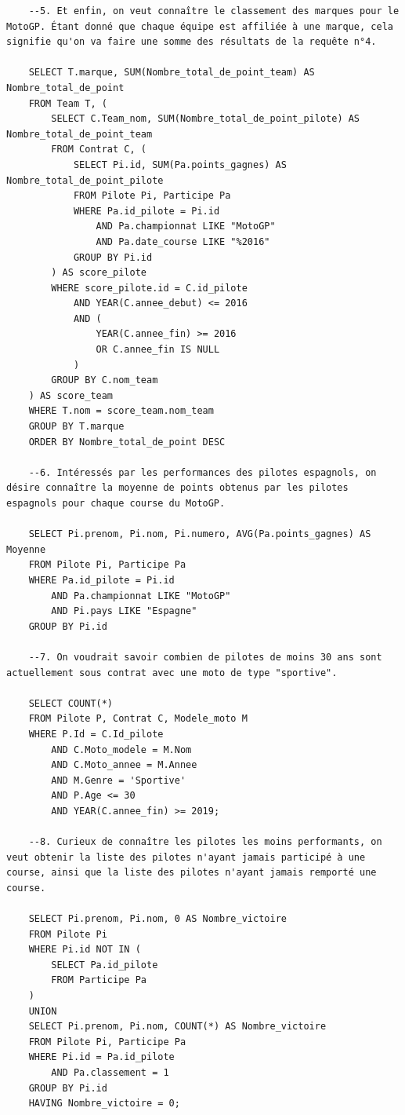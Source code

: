 \documentclass[12pt,a4paper]{article}
\newenvironment{code}{\captionsetup{type=listing}}{}
\begin{document}
\begin{code}
\begin{verbatim}
    --5. Et enfin, on veut connaître le classement des marques pour le MotoGP. Étant donné que chaque équipe est affiliée à une marque, cela signifie qu'on va faire une somme des résultats de la requête n°4.

    SELECT T.marque, SUM(Nombre_total_de_point_team) AS Nombre_total_de_point
    FROM Team T, (
        SELECT C.Team_nom, SUM(Nombre_total_de_point_pilote) AS Nombre_total_de_point_team
        FROM Contrat C, (
            SELECT Pi.id, SUM(Pa.points_gagnes) AS Nombre_total_de_point_pilote
            FROM Pilote Pi, Participe Pa
            WHERE Pa.id_pilote = Pi.id
                AND Pa.championnat LIKE "MotoGP"
                AND Pa.date_course LIKE "%2016"
            GROUP BY Pi.id
        ) AS score_pilote
        WHERE score_pilote.id = C.id_pilote
            AND YEAR(C.annee_debut) <= 2016
            AND (
                YEAR(C.annee_fin) >= 2016
                OR C.annee_fin IS NULL
            )
        GROUP BY C.nom_team
    ) AS score_team
    WHERE T.nom = score_team.nom_team
    GROUP BY T.marque
    ORDER BY Nombre_total_de_point DESC
    
    --6. Intéressés par les performances des pilotes espagnols, on désire connaître la moyenne de points obtenus par les pilotes espagnols pour chaque course du MotoGP.

    SELECT Pi.prenom, Pi.nom, Pi.numero, AVG(Pa.points_gagnes) AS Moyenne
    FROM Pilote Pi, Participe Pa
    WHERE Pa.id_pilote = Pi.id
        AND Pa.championnat LIKE "MotoGP"
        AND Pi.pays LIKE "Espagne"
    GROUP BY Pi.id
    
    --7. On voudrait savoir combien de pilotes de moins 30 ans sont actuellement sous contrat avec une moto de type "sportive".

    SELECT COUNT(*)
    FROM Pilote P, Contrat C, Modele_moto M
    WHERE P.Id = C.Id_pilote
        AND C.Moto_modele = M.Nom
        AND C.Moto_annee = M.Annee
        AND M.Genre = 'Sportive'
        AND P.Age <= 30
        AND YEAR(C.annee_fin) >= 2019;
        
    --8. Curieux de connaître les pilotes les moins performants, on veut obtenir la liste des pilotes n'ayant jamais participé à une course, ainsi que la liste des pilotes n'ayant jamais remporté une course.

    SELECT Pi.prenom, Pi.nom, 0 AS Nombre_victoire
    FROM Pilote Pi
    WHERE Pi.id NOT IN (
        SELECT Pa.id_pilote
        FROM Participe Pa
    )
    UNION
    SELECT Pi.prenom, Pi.nom, COUNT(*) AS Nombre_victoire
    FROM Pilote Pi, Participe Pa
    WHERE Pi.id = Pa.id_pilote
        AND Pa.classement = 1
    GROUP BY Pi.id
    HAVING Nombre_victoire = 0;    
    

\end{verbatim}
\end{code}
\end{document}
